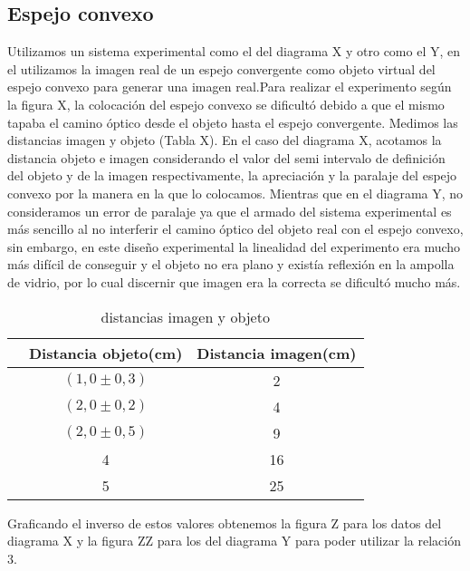 \documentclass[a4paper,12pt]{article}
\begin{document}
\subsection{Espejo convexo}
Utilizamos un sistema experimental como el del diagrama X y otro como el Y, en el utilizamos la imagen real de un espejo convergente como objeto virtual del espejo convexo para generar una imagen real.Para realizar el experimento según la figura X, la colocación del espejo convexo se dificultó debido a que el mismo tapaba el camino óptico desde el objeto hasta el espejo convergente. 
Medimos las distancias imagen y objeto (Tabla X). En el caso del diagrama X, acotamos la distancia objeto e imagen considerando el valor del semi intervalo de definición del objeto y de la imagen respectivamente, la apreciación y la paralaje del espejo convexo por la manera en la que lo colocamos. Mientras que en el diagrama Y, no consideramos un error de paralaje ya que el armado del sistema experimental es más sencillo al no interferir el camino óptico del objeto real con el espejo convexo, sin embargo, en este diseño experimental la linealidad del experimento era mucho más difícil de conseguir y el objeto no era plano y existía reflexión en la ampolla de vidrio, por lo cual discernir que imagen era la correcta se dificultó mucho más.
\begin{table}
    \center
    \begin{tabular}{| c | c | c | }
        \hline
        & \bf{Distancia objeto(cm)} & \bf{Distancia imagen(cm)} \\ \hline
        & $(1,0 \pm 0,3)$ & 2 \\
        & $(2,0 \pm 0,2)$ & 4 \\
        & $(2,0 \pm 0,5)$ & 9 \\
        & 4 & 16 \\ 
        & 5 & 25 \\ \hline
    \end{tabular}
    \caption{ distancias imagen y objeto}
    \label{table: distancias}
\end{table}


Graficando el inverso de estos valores obtenemos la figura Z para los datos del diagrama X y la figura ZZ para los del diagrama Y para poder utilizar la relación 3.
\end{document}

